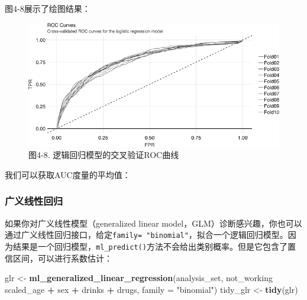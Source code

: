 \documentclass[
]{article}
\newenvironment{Shaded}{\begin{snugshade}}{\end{snugshade}}
\newcommand{\DataTypeTok}[1]{\textcolor[rgb]{0.13,0.29,0.53}{#1}}
\newcommand{\DecValTok}[1]{\textcolor[rgb]{0.00,0.00,0.81}{#1}}
\newcommand{\FloatTok}[1]{\textcolor[rgb]{0.00,0.00,0.81}{#1}}
\newcommand{\KeywordTok}[1]{\textcolor[rgb]{0.13,0.29,0.53}{\textbf{#1}}}
\newcommand{\NormalTok}[1]{#1}
\newcommand{\OperatorTok}[1]{\textcolor[rgb]{0.81,0.36,0.00}{\textbf{#1}}}
\newcommand{\StringTok}[1]{\textcolor[rgb]{0.31,0.60,0.02}{#1}}
\begin{document}
图4-8展示了绘图结果：

\begin{figure}
\centering
\includegraphics{figures/4_8.png}
\caption{图4-8. 逻辑回归模型的交叉验证ROC曲线}
\end{figure}

我们可以获取AUC度量的平均值：

\begin{Shaded}
\end{Shaded}

\hypertarget{ux5e7fux4e49ux7ebfux6027ux56deux5f52}{%
\subsubsection{广义线性回归}\label{ux5e7fux4e49ux7ebfux6027ux56deux5f52}}

如果你对广义线性模型（generalized linear
model，GLM）诊断感兴趣，你也可以通过广义线性回归接口，给定\texttt{family=\ "binomial"}，拟合一个逻辑回归模型。因为结果是一个回归模型，\texttt{ml\_predict()}方法不会给出类别概率。但是它包含了置信区间，可以进行系数估计：

\begin{Shaded}
\begin{Highlighting}[]
\NormalTok{glr <-}\StringTok{ }\KeywordTok{ml_generalized_linear_regression}\NormalTok{(analysis_set, not_working }\OperatorTok{~}\StringTok{ }\NormalTok{scaled_age }\OperatorTok{+}\StringTok{ }
\StringTok{    }\NormalTok{sex }\OperatorTok{+}\StringTok{ }\NormalTok{drinks }\OperatorTok{+}\StringTok{ }\NormalTok{drugs, }\DataTypeTok{family =} \StringTok{"binomial"}\NormalTok{)}
\NormalTok{tidy_glr <-}\StringTok{ }\KeywordTok{tidy}\NormalTok{(glr)}
\end{Highlighting}
\end{Shaded}
\end{document}
